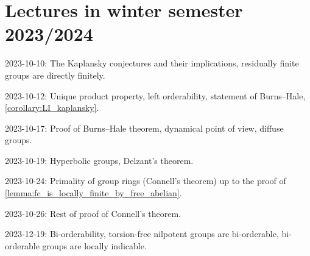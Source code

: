 \chapter{Lectures in winter semester 2023/2024}

2023-10-10: The Kaplansky conjectures and their implications, residually finite groups are directly finitely.

2023-10-12: Unique product property, left orderability, statement of Burns--Hale, \cref{corollary:LI_kaplansky}.

2023-10-17: Proof of Burns--Hale theorem, dynamical point of view, diffuse groups.

2023-10-19: Hyperbolic groups, Delzant's theorem.

2023-10-24: Primality of group rings (Connell's theorem) up to the proof of \cref{lemma:fc_is_locally_finite_by_free_abelian}.

2023-10-26: Rest of proof of Connell's theorem.

2023-12-19: Bi-orderability, torsion-free nilpotent groups are bi-orderable, bi-orderable groups are locally indicable.
